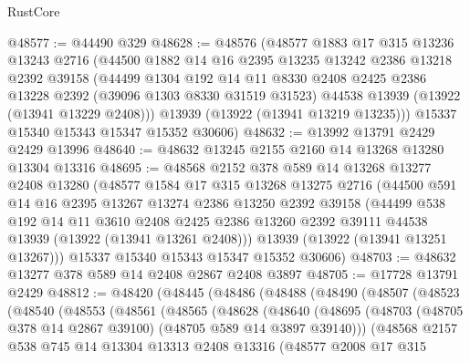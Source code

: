 \begin{lexlean}{RustCore}
\begin{coremodule}
@48577 := @44490 @329
@48628 := @48576
    (@48577
      @1883
      @17
      @315
      @13236
      @13243
      @2716
      (@44500
        @1882
        @14
        @16
        @2395
        @13235
        @13242
        @2386
        @13218
        @2392
        @39158
        (@44499
          @1304
          @192
          @14
          @11
          @8330
          @2408
          @2425
          @2386
          @13228
          @2392
          (@39096 @1303 @8330 @31519 @31523)
          @44538
          @13939
          (@13922 (@13941 @13229 @2408)))
        @13939
        (@13922 (@13941 @13219 @13235)))
      @15337
      @15340
      @15343
      @15347
      @15352
      @30606)
@48632 := @13992 @13791 @2429 @2429 @13996
@48640 := @48632 @13245 @2155 @2160 @14 @13268 @13280 @13304 @13316
@48695 := @48568
    @2152
    @378
    @589
    @14
    @13268
    @13277
    @2408
    @13280
    (@48577
      @1584
      @17
      @315
      @13268
      @13275
      @2716
      (@44500
        @591
        @14
        @16
        @2395
        @13267
        @13274
        @2386
        @13250
        @2392
        @39158
        (@44499
          @538
          @192
          @14
          @11
          @3610
          @2408
          @2425
          @2386
          @13260
          @2392
          @39111
          @44538
          @13939
          (@13922 (@13941 @13261 @2408)))
        @13939
        (@13922 (@13941 @13251 @13267)))
      @15337
      @15340
      @15343
      @15347
      @15352
      @30606)
@48703 := @48632 @13277 @378 @589 @14 @2408 @2867 @2408 @3897
@48705 := @17728 @13791 @2429
@48812 := @48420
    (@48445
      (@48486
        (@48488
          (@48490
            (@48507
              (@48523
                (@48540
                  (@48553
                    (@48561
                      (@48565
                        (@48628
                          (@48640
                            (@48695
                              (@48703
                                (@48705 @378 @14 @2867 @39100)
                                (@48705 @589 @14 @3897 @39140)))
                            (@48568
                              @2157
                              @538
                              @745
                              @14
                              @13304
                              @13313
                              @2408
                              @13316
                              (@48577
                                @2008
                                @17
                                @315

\end{coremodule}
\end{lexlean}

